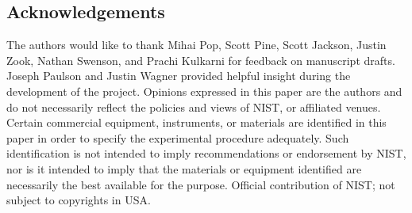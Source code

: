 \documentclass{bmcart}
\begin{document}
\begin{backmatter}
\subsection*{Acknowledgements}
 The authors would like to thank Mihai
Pop, Scott Pine, Scott Jackson, Justin Zook, Nathan Swenson, and Prachi Kulkarni for
feedback on manuscript drafts. Joseph Paulson and Justin Wagner provided
helpful insight during the development of the project.
Opinions expressed in this paper are the
authors and do not necessarily reflect the policies and views of NIST,
or affiliated venues. Certain commercial equipment, instruments, or
materials are identified in this paper in order to specify the
experimental procedure adequately. Such identification is not intended
to imply recommendations or endorsement by NIST, nor is it intended to
imply that the materials or equipment identified are necessarily the
best available for the purpose. Official contribution of NIST; not
subject to copyrights in USA.







\end{backmatter}
\end{document}

